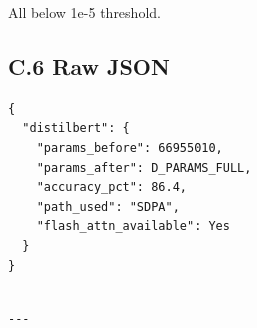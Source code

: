 All below 1e-5 threshold.

\subsection{C.6 Raw JSON}

\begin{lstlisting}
{
  "distilbert": {
    "params_before": 66955010,
    "params_after": D_PARAMS_FULL,
    "accuracy_pct": 86.4,
    "path_used": "SDPA",
    "flash_attn_available": Yes
  }
}
\end{lstlisting}
\begin{lstlisting}

---
\end{lstlisting}